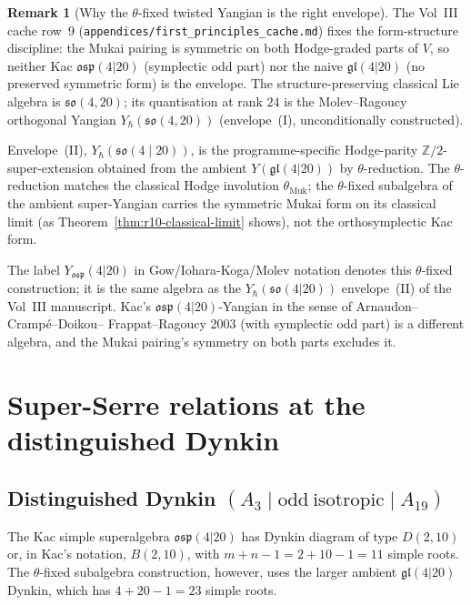 \documentclass{article}
\providecommand{\Z}{\mathbb Z}
\providecommand{\fgl}{\mathfrak{gl}}
\providecommand{\fso}{\mathfrak{so}}
\providecommand{\fosp}{\mathfrak{osp}}
\theoremstyle{definition}
\newtheorem{remark}[theorem]{Remark}
\begin{document}
\begin{remark}[Why the $\theta$-fixed twisted Yangian is the right
envelope]
\label{rem:r10-why-theta-fixed}
The Vol~III cache row~9 (\texttt{appendices/first\_principles\_cache.md})
fixes the form-structure discipline: the Mukai pairing is symmetric
on both Hodge-graded parts of $V$, so neither Kac $\fosp(4|20)$
(symplectic odd part) nor the naive $\fgl(4|20)$ (no preserved
symmetric form) is the envelope. The structure-preserving
classical Lie algebra is $\fso(4, 20)$; its quantisation at rank
$24$ is the Molev--Ragoucy orthogonal Yangian
$Y_\hbar(\fso(4, 20))$ (envelope~(I), unconditionally constructed).

Envelope~(II), $Y_\hbar(\fso(4 \mid 20))$, is the programme-specific
Hodge-parity $\Z/2$-super-extension obtained from the ambient
$Y(\fgl(4|20))$ by $\theta$-reduction. The $\theta$-reduction matches
the classical Hodge involution $\theta_{\mathrm{Muk}}$; the
$\theta$-fixed subalgebra of the ambient super-Yangian carries the
symmetric Mukai form on its classical limit (as
Theorem~\ref{thm:r10-classical-limit} shows), not the orthosymplectic
Kac form.

The label $Y_{\fosp}(4|20)$ in Gow/Iohara-Koga/Molev notation denotes
this $\theta$-fixed construction; it is the same algebra as the
$Y_\hbar(\fso(4|20))$ envelope~(II) of the Vol~III manuscript. Kac's
$\fosp(4|20)$-Yangian in the sense of Arnaudon--Cramp\'e--Doikou--
Frappat--Ragoucy 2003 (with symplectic odd part) is a different
algebra, and the Mukai pairing's symmetry on both parts excludes it.
\end{remark}

\section{Super-Serre relations at the distinguished Dynkin}
\label{sec:r10-super-Serre}

\subsection{Distinguished Dynkin $(A_3 \mid \mathrm{odd\ isotropic} \mid A_{19})$}

The Kac simple superalgebra $\fosp(4|20)$ has Dynkin diagram of
type $D(2, 10)$ or, in Kac's notation, $B(2, 10)$, with $m + n - 1 =
2 + 10 - 1 = 11$ simple roots. The $\theta$-fixed subalgebra
construction, however, uses the larger ambient $\fgl(4|20)$ Dynkin,
which has $4 + 20 - 1 = 23$ simple roots.
\end{document}
